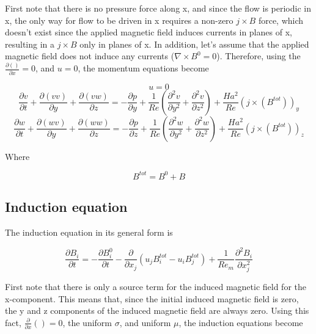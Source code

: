 \documentclass[11pt]{article}
\begin{document}
First note that there is no pressure force along x, and since the flow is periodic in x, the only way for flow to be driven in x requires a non-zero $j\times B$ force, which doesn't exist since the applied magnetic field induces currents in planes of x, resulting in a $j\times B$ only in planes of x. In addition, let's assume that the applied magnetic field does not induce any currents ($\nabla \times B^0=0$). Therefore, using the $\frac{\partial ()}{\partial x} = 0$, and $u = 0$, the momentum equations become

\begin{equation}
	u=0
\end{equation}
\begin{equation}
	\frac{\partial v}{\partial t} 
	+ \frac{\partial (v v)}{\partial y}
	+ \frac{\partial (v w)}{\partial z}
	= 
	- \frac{\partial p}{\partial y}
	+ \frac{1}{Re}
	\left(
	\frac{\partial^2 v}{\partial y^2}
	+\frac{\partial^2 v}{\partial z^2}
	\right)
	+ \frac{Ha^2}{Re}
	(j \times (B^{tot}))_y
\end{equation}
\begin{equation}
	\frac{\partial w}{\partial t} 
	+ \frac{\partial (w v)}{\partial y}
	+ \frac{\partial (w w)}{\partial z}
	= 
	- \frac{\partial p}{\partial z}
	+ \frac{1}{Re}
	\left(
	\frac{\partial^2 w}{\partial y^2}
	+\frac{\partial^2 w}{\partial z^2}
	\right)
	+ \frac{Ha^2}{Re}
	(j \times (B^{tot}))_z
\end{equation}

Where

\begin{equation}
	B^{tot} = B^0 + B
\end{equation}

\subsection{Induction equation}

The induction equation in its general form is

\begin{equation}
	\frac{\partial B_i}{\partial t} 
	=
	- \frac{\partial B_i^0}{\partial t} 
	- \frac{\partial}{\partial x_j} (u_j B_i^{tot} - u_i B_j^{tot}) 
	+
	\frac{1}{Re_m}
	\frac{\partial^2 B_i}{\partial x_j^2}
\end{equation}

First note that there is only a source term for the induced magnetic field for the x-component. This means that, since the initial induced magnetic field is zero, the y and z components of the induced magnetic field are always zero. Using this fact, $\frac{\partial}{\partial x} ()=0$, the uniform $\sigma$, and uniform $\mu$, the induction equations become
\end{document}
